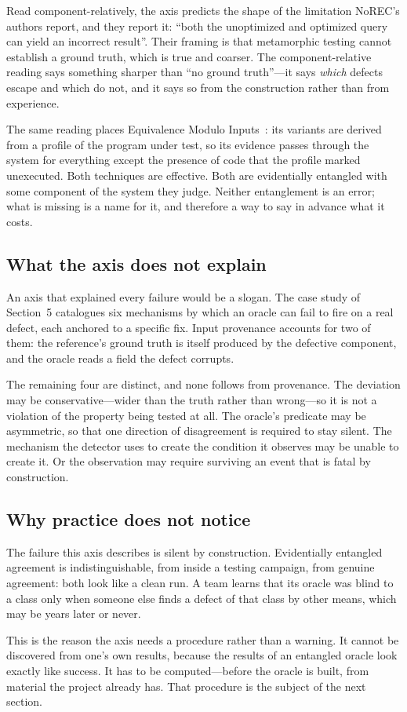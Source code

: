 Read component-relatively, the axis predicts the shape of the limitation NoREC's
authors report, and they report it: ``both the unoptimized and optimized query can
yield an incorrect result''. Their framing is that metamorphic testing cannot
establish a ground truth, which is true and coarser. The component-relative reading
says something sharper than ``no ground truth''---it says \emph{which} defects
escape and which do not, and it says so from the construction rather than from
experience.

The same reading places Equivalence Modulo Inputs~\cite{le2014emi}: its variants are
derived from a profile of the program under test, so its evidence passes through the
system for everything except the presence of code that the profile marked
unexecuted. Both techniques are effective. Both are evidentially entangled with some
component of the system they judge. Neither entanglement is an error; what is
missing is a name for it, and therefore a way to say in advance what it costs.

\subsection{What the axis does not explain}

An axis that explained every failure would be a slogan. The case study of Section~5
catalogues six mechanisms by which an oracle can fail to fire on a real defect, each
anchored to a specific fix. Input provenance accounts for two of them: the reference's
ground truth is itself produced by the defective component, and the oracle reads a
field the defect corrupts.

The remaining four are distinct, and none follows from provenance. The deviation may
be conservative---wider than the truth rather than wrong---so it is not a violation
of the property being tested at all. The oracle's predicate may be asymmetric, so
that one direction of disagreement is required to stay silent. The mechanism the
detector uses to create the condition it observes may be unable to create it. Or the
observation may require surviving an event that is fatal by construction.

\subsection{Why practice does not notice}

The failure this axis describes is silent by construction. Evidentially entangled
agreement is indistinguishable, from inside a testing campaign, from genuine
agreement: both look like a clean run. A team learns that its oracle was blind to a
class only when someone else finds a defect of that class by other means, which may
be years later or never.

This is the reason the axis needs a procedure rather than a warning. It cannot be
discovered from one's own results, because the results of an entangled oracle look
exactly like success. It has to be computed---before the oracle is built, from
material the project already has. That procedure is the subject of the next section.
